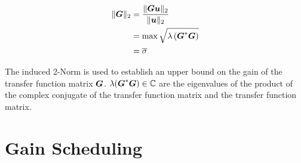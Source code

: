 \begin{align}
\begin{split}
\lVert \mbox{\boldmath$G$} \rVert_2 &= \frac{\lVert \mbox{\boldmath$G$}\mbox{\boldmath$u$}\rVert_2}{\lVert \mbox{\boldmath$u$} \rVert_2} \\
&= \max \sqrt{\lambda\left( \mbox{\boldmath$G$}^* \mbox{\boldmath$G$}\right)} \\
&= \overline{\sigma}
\end{split}
\label{c:control:e:MaxSingularValue}
\end{align}

The induced 2-Norm is used to establish an upper bound on the gain of the transfer function matrix $\mbox{\boldmath$G$}$. $\lambda(\mbox{\boldmath$G$}^* \mbox{\boldmath$G$}) \in \mathbb{C}$ are the eigenvalues of the product of the complex conjugate of the transfer function matrix and the transfer function matrix.

\section{Gain Scheduling} %
\label{c:control:s:gainsched}

